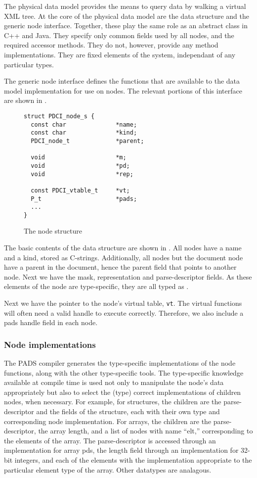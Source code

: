 {The physical data model provides the means to query \pads{} data by
walking a virtual XML tree.  At the core of the physical data model
are the  data structure and the generic node interface.
Together, these play the same role as an abstract class in C++ and
Java. They specify only common fields used by all nodes, and the
required accessor methods. They do not, however, provide any method
implementations. They are fixed elements of the system, independant of
any particular \pads{} types.

The generic node interface defines the functions that are available to the
\pads{} data model implementation for use on nodes. The relevant portions of
this interface are shown in .

\begin{figure}
{\small
\begin{verbatim}
struct PDCI_node_s {
  const char              *name;
  const char              *kind;
  PDCI_node_t             *parent;

  void                    *m;
  void                    *pd;
  void                    *rep;

  const PDCI_vtable_t     *vt;
  P_t                     *pads;
  ...
}
\end{verbatim}
}
\caption{The node structure}
\label{fig:node-struct}
\end{figure}

The basic contents of the  data structure are shown in
. All nodes have a name and a kind, stored as
C-strings. Additionally, all nodes but the document node have a parent
in the document, hence the parent field that points to another node.
Next we have the mask, representation and parse-descriptor fields. As
these elements of the node are type-specific, they are all typed as
\vptr.

Next we have the pointer to the node's virtual table, {\tt vt}. The
virtual functions will often need a valid \pads{} handle to execute
correctly. Therefore, we also include a pads handle field in each
node.

\subsubsection{Node implementations}
The PADS compiler generates the type-specific implementations of the
node functions, along with the other type-specific tools.  The
type-specific knowledge available at compile time is used not only to
manipulate the node's data appropriately but also to select the (type)
correct implementations of children nodes, when necessary.  For
example, for structures, the children are the parse-descriptor and the
fields of the structure, each with their own type and corresponding
node implementation.  For arrays, the children are the
parse-descriptor, the array length, and a list of nodes with name
``elt,'' corresponding to the elements of the array. The
parse-descriptor is accessed through an implementation for array pds,
the length field through an implementation for 32-bit integers, and
each of the elements with the implementation appropriate to the
particular element type of the array. Other datatypes are analagous.

}
